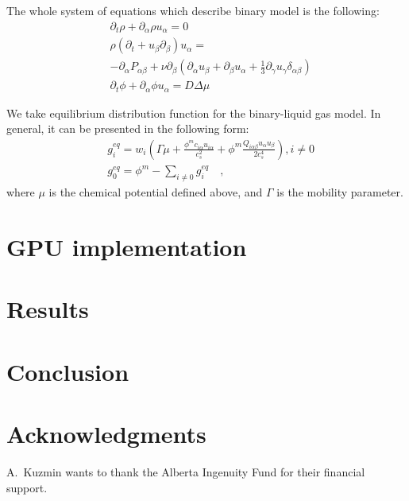 \documentclass[mathpazo]{cicp}
\begin{document}
The whole system of equations which describe binary model is the following:
\begin{equation}
\begin{aligned}
&\partial_t \rho+ \partial_{\alpha} \rho u_{\alpha}=0\\
&\rho\left(\partial_t+u_{\beta}\partial_{\beta}\right) u_{\alpha}=\\
&-\partial_{\alpha}P_{\alpha \beta} + \nu\partial_{\beta}\left(\partial_{\alpha}u_{\beta}+\partial_{\beta} u_{\alpha} + \frac{1}{3}\partial_{\gamma} u_{\gamma} \delta_{\alpha\beta}\right)\\
&\partial_t \phi + \partial_{\alpha} \phi u_{\alpha}=D\Delta \mu
\end{aligned}
\label{binary:fluid:system}
\end{equation}

We take equilibrium distribution function for the binary-liquid gas model. In general, it can be presented in the following form:
\begin{equation}
\begin{aligned}
&g_i^{eq}=w_i(\Gamma \mu + \frac{\phi^m c_{i\alpha} u_{i\alpha}}{c_s^2}+\phi^m \frac{Q_{i\alpha\beta}u_{\alpha}u_{\beta}}{2 c_s^4}), i\neq0 \\
&g_0^{eq}=\phi^m-\sum_{i\neq0}{g_i^{eq}}\quad,
\end{aligned}
\end{equation}
where $\mu$ is the chemical potential defined above, and $\Gamma$ is the mobility parameter.

\section{GPU implementation}
\section{Results}
\section{Conclusion}
\section*{Acknowledgments}
A.~Kuzmin wants to thank the Alberta Ingenuity Fund for their financial support.




\end{document}
